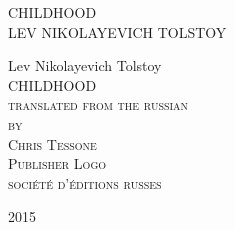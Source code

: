 
\newlength{\drop}\setlength{\drop}{0.12\textheight}

\newcommand*{\firsttitle}{\begingroup
\centering
\vspace*{3em}
{\Large CHILDHOOD}\\[\baselineskip]
{\Large LEV NIKOLAYEVICH TOLSTOY}
\vfill\null
\endgroup}

\newcommand*{\titleAM}{\begingroup
\centering
\vspace*{\drop}
{\large Lev Nikolayevich Tolstoy}\\[\baselineskip]
{\Huge CHILDHOOD}\\[\baselineskip]
{\scshape translated from the russian}\\
{\scshape by}\\
{\scshape Chris Tessone}\\[\drop]
{\scshape Publisher Logo}\\[0.5\baselineskip]
{\small\scshape soci\'et\'e d'\'editions russes}\par
{\small\scshape 2015}\par
\vfill\null
\endgroup}

\firsttitle
\thispagestyle{empty}
\clearpage

\newpage\null\thispagestyle{empty}\newpage

\titleAM
\thispagestyle{empty}
\clearpage 
